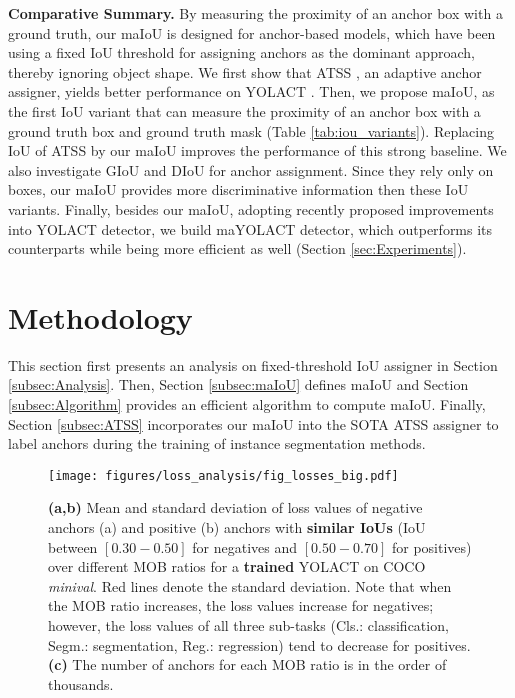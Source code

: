 \documentclass{bmvc2k}
\begin{document}
\noindent \textbf{Comparative Summary.} By measuring the proximity of an anchor box with a ground truth, our maIoU is designed for anchor-based models, which have been using a fixed IoU threshold for assigning anchors as the dominant approach, thereby ignoring  object shape. We first show that ATSS \cite{ATSS}, an adaptive anchor assigner, yields better performance on YOLACT \cite{yolact}. Then, we propose maIoU, as the first IoU variant that can measure the proximity of an anchor box with a ground truth box and ground truth mask (Table \ref{tab:iou_variants}). Replacing IoU of ATSS by our maIoU improves the performance of this strong baseline. We also investigate  GIoU and DIoU for anchor assignment. Since they rely only on boxes, our maIoU provides more discriminative information then these IoU variants. Finally, besides our maIoU, adopting recently proposed improvements into YOLACT detector, we build maYOLACT detector, which outperforms its counterparts while being more efficient as well (Section \ref{sec:Experiments}). \section{Methodology}
\label{sec:miou}

This section first presents an analysis on fixed-threshold IoU assigner in Section \ref{subsec:Analysis}. Then, Section \ref{subsec:maIoU} defines maIoU and Section \ref{subsec:Algorithm} provides an efficient algorithm to compute maIoU. Finally, Section \ref{subsec:ATSS} incorporates our maIoU into the SOTA ATSS assigner \cite{ATSS} to label  anchors during the training of instance segmentation methods.

\begin{figure}
    \centering
    \texttt{[image: figures/loss\_analysis/fig\_losses\_big.pdf]}
    \caption{\small \textbf{(a,b)} Mean and standard deviation of loss values of negative anchors (a) and positive (b) anchors with \textbf{similar IoUs} (IoU between $[0.30-0.50]$ for negatives and $[0.50-0.70]$ for positives) over different MOB ratios for a \textbf{trained} YOLACT on COCO \textit{minival}. Red lines denote the standard deviation. Note that when the MOB ratio increases, the loss values  increase for negatives; however,  the loss values of all three sub-tasks (Cls.: classification, Segm.: segmentation, Reg.: regression) tend to decrease for positives.
\textbf{(c)} The number of anchors for each MOB ratio is in the order of thousands.
    \label{fig:LossAnalysis}}
\end{figure}
\end{document}
